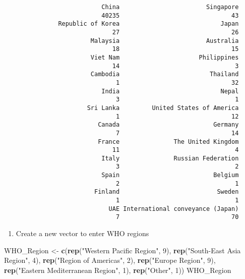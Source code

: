 \documentclass[]{article}
\newenvironment{Shaded}{\begin{snugshade}}{\end{snugshade}}
\newcommand{\DecValTok}[1]{\textcolor[rgb]{0.00,0.00,0.81}{#1}}
\newcommand{\KeywordTok}[1]{\textcolor[rgb]{0.13,0.29,0.53}{\textbf{#1}}}
\newcommand{\NormalTok}[1]{#1}
\newcommand{\StringTok}[1]{\textcolor[rgb]{0.31,0.60,0.02}{#1}}
\providecommand{\tightlist}{%
  \setlength{\itemsep}{0pt}\setlength{\parskip}{0pt}}
\begin{document}
\begin{verbatim}
                           China                        Singapore 
                           40235                               43 
               Republic of Korea                            Japan 
                              27                               26 
                        Malaysia                        Australia 
                              18                               15 
                        Viet Nam                      Philippines 
                              14                                3 
                        Cambodia                         Thailand 
                               1                               32 
                           India                            Nepal 
                               3                                1 
                       Sri Lanka         United States of America 
                               1                               12 
                          Canada                          Germany 
                               7                               14 
                          France               The United Kingdom 
                              11                                4 
                           Italy               Russian Federation 
                               3                                2 
                           Spain                          Belgium 
                               2                                1 
                         Finland                           Sweden 
                               1                                1 
                             UAE International conveyance (Japan) 
                               7                               70 
\end{verbatim}

\begin{enumerate}
\def\labelenumi{\alph{enumi})}
\setcounter{enumi}{21}
\tightlist
\item
  Create a new vector to enter WHO regions
\end{enumerate}

\begin{Shaded}
\begin{Highlighting}[]
\NormalTok{WHO_Region <-}\StringTok{ }\KeywordTok{c}\NormalTok{(}\KeywordTok{rep}\NormalTok{(}\StringTok{"Western Pacific Region"}\NormalTok{, }\DecValTok{9}\NormalTok{),}
                \KeywordTok{rep}\NormalTok{(}\StringTok{"South-East Asia Region"}\NormalTok{, }\DecValTok{4}\NormalTok{), }
                \KeywordTok{rep}\NormalTok{(}\StringTok{"Region of Americas"}\NormalTok{, }\DecValTok{2}\NormalTok{),}
                \KeywordTok{rep}\NormalTok{(}\StringTok{"Europe Region"}\NormalTok{, }\DecValTok{9}\NormalTok{),}
                \KeywordTok{rep}\NormalTok{(}\StringTok{"Eastern Mediterranean Region"}\NormalTok{, }\DecValTok{1}\NormalTok{),}
                \KeywordTok{rep}\NormalTok{(}\StringTok{"Other"}\NormalTok{, }\DecValTok{1}\NormalTok{))}
\NormalTok{WHO_Region}
\end{Highlighting}
\end{Shaded}
\end{document}
